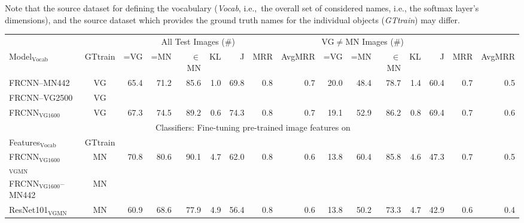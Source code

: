 Note that the source dataset for defining the vocabulary (\textsl{Vocab}, i.e.,\ the overall set of considered names, i.e., the softmax layer's dimensions), and the source dataset which provides the ground truth names for the individual objects (\textsl{GTtrain}) may differ.  
\begin{table}[t]
	\centering
	\small
	\begin{tabular}{l|c|r@{~}r@{~}r@{~}r@{~}r@{~}r@{~}r|@{~}r@{~}r@{~}r@{~}r@{~}r@{~}r@{~}r@{~}}
		\toprule
		&   & \multicolumn{6}{c}{All Test Images ($\#$)} 
		& \multicolumn{6}{c}{VG$\neq$MN Images ($\#$)}\\	
		Model$_{\text{Vocab}}$	 
		&  GTtrain &  =VG & =MN & $\in$MN  & KL & J & MRR & AvgMRR 
		&  =VG & =MN & $\in$MN  & KL & J & MRR & AvgMRR\\ 
		\midrule
		FRCNN--MN442 & VG &            65.4 &              71.2 &                85.6 &         1.0 &             69.8 &          0.8 &             0.7 &            20.0 &              48.4 &                78.7 &         1.4 &             60.4 &          0.7 &             0.5 \\
		FRCNN--VG2500 & VG \\
		FRCNN$_{\text{VG1600}}$ & VG &            67.3 &              74.5 &                89.2 &         0.6 &             74.3 &          0.8 &             0.7 &            19.1 &              52.9 &                86.2 &         0.8 &             69.4 &          0.7 &             0.6 \\
		\midrule \midrule
		& \multicolumn{12}{c}{Classifiers: Fine-tuning pre-trained image features on \mn}\\
		Features$_{\text{Vocab}}$ & GTtrain  \\
		\midrule 
		FRCNN$_{\text{VG1600}}$$_{\text{VGMN}}$ & MN &            70.8 &              80.6 &                90.1 &         4.7 &             62.0 &          0.8 &             0.6 &            13.8 &              60.4 &                85.8 &         4.6 &             47.3 &          0.7 &             0.5 \\ 
		FRCNN$_{\text{VG1600}}$--MN442 &  MN \\
		\midrule
		ResNet101$_{\text{VGMN}}$ & MN  &            60.9 &              68.6 &                77.9 &         4.9 &             56.4 &          0.8 &             0.6 &            13.8 &              50.2 &                73.3 &         4.7 &             42.9 &          0.6 &             0.4 \\
		

\end{tabular}
\end{table}
